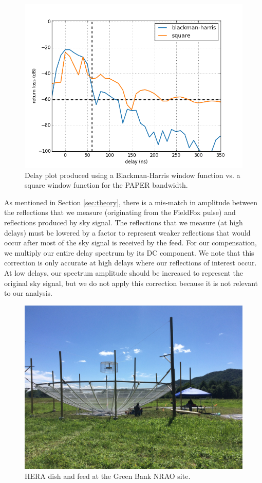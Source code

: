 \documentclass[12pt,preprint]{aastex}
\begin{document}
\begin{figure}
\centering
\includegraphics[totalheight=0.4\textheight]{plots/bh_vs_sq.png}
\caption{Delay plot produced using a Blackman-Harris window function vs. a square window function for the PAPER bandwidth.}
\label{fig:window}
\end{figure}

As mentioned in Section \ref{sec:theory}, there is a mis-match in amplitude between the reflections that we measure (originating from the FieldFox pulse) and reflections produced by sky signal. The reflections that we measure (at high delays) must be lowered by a factor to represent weaker reflections that would occur after most of the sky signal is received by the feed. For our compensation, we multiply our entire delay spectrum by its DC component. We note that this correction is only accurate at high delays where our reflections of interest occur. At low delays, our spectrum amplitude should be increased to represent the original sky signal, but we do not apply this correction because it is not relevant to our analysis.

\begin{figure}
\centering
\includegraphics[trim={2cm 20cm 30cm 15cm},clip, totalheight=0.3\textheight]{plots/heradish.jpg}
\caption{HERA dish and feed at the Green Bank NRAO site.}
\label{fig:heradish}
\end{figure}
\end{document}
